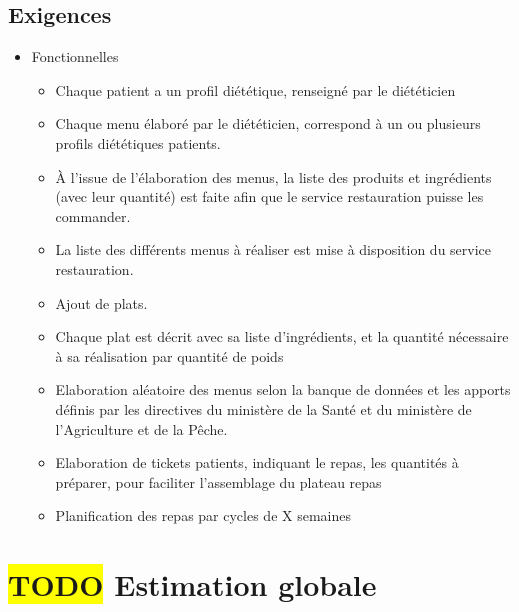 \subsection{Exigences}
\begin{itemize}
\item Fonctionnelles
  \begin{itemize}
  \item Chaque patient a un profil diététique, renseigné par le diététicien
  \item Chaque menu élaboré par le diététicien, correspond à un ou plusieurs profils diététiques patients.
  \item À l'issue de l'élaboration des menus, la liste des produits et
    ingrédients (avec leur quantité) est faite afin que le service
    restauration puisse les commander.
  \item La liste des différents menus à réaliser est mise à disposition du service restauration.
  \item Ajout de plats.
  \item Chaque plat est décrit avec sa liste d'ingrédients, et la quantité nécessaire à sa réalisation par quantité de poids
  \item Elaboration aléatoire des menus selon la banque de données et les apports définis par les directives
        du ministère de la Santé et du ministère de l’Agriculture et de la Pêche.
  \item Elaboration de tickets patients, indiquant le repas, les quantités à préparer, pour faciliter l'assemblage du plateau repas
  \item Planification des repas par cycles de X semaines
  \end{itemize}
\end{itemize}

\section{\colorbox{yellow}{TODO} Estimation globale}
